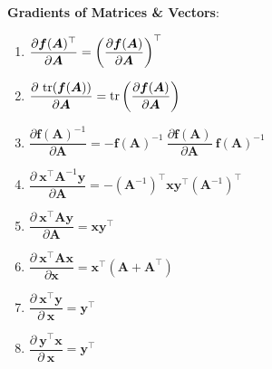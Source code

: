 \vspace{0.5cm}
\textbf{Gradients of Matrices \& Vectors}:

\begin{multicols}{2}
\begin{enumerate}[resume*=vcalrules]
    \item $
        \dfrac{\partial \bm{f}(\bm{A})^\top}{\partial \bm{A}}
        = \left(\dfrac{\partial \bm{f}(\bm{A})}{\partial \bm{A}}\right)^\top
    $
    \hfill \cite{mfml/book/mml/Deisenroth-Faisal-Ong}

    \item $
        \dfrac{\partial\ \tr(\bm{f}(\bm{A}))}{\partial \bm{A}}
        = \tr\dParenBrac{\dfrac{\partial \bm{f}(\bm{A})}{\partial \bm{A}}}
    $
    \hfill \cite{mfml/book/mml/Deisenroth-Faisal-Ong}

    \item 
    $
        \dfrac{\partial \bm{f}(\bm{A})^{-1}}{\partial \bm{A}}
        = -\bm{f}(\bm{A})^{-1}\ \dfrac{\partial \bm{f}(\bm{A})}{\partial \bm{A}} \ \bm{f}(\bm{A})^{-1}
    $ 
    \hfill \cite{mfml/book/mml/Deisenroth-Faisal-Ong}

    \item 
    $
        \dfrac{\partial\ \bm{x}^\top \bm{A}^{-1}\bm{y}}{\partial \bm{A}}
        = -(\bm{A}^{-1})^\top \bm{xy}^\top (\bm{A}^{-1})^\top
    $
    \hfill \cite{mfml/book/mml/Deisenroth-Faisal-Ong}

    \item 
    $
        \dfrac{\partial\ \bm{x}^\top \bm{A}\bm{y}}{\partial \bm{A}}
        = \bm{xy}^\top 
    $
    \hfill \cite{mfml/book/mml/Deisenroth-Faisal-Ong}

    \item 
    $
        \dfrac{\partial\ \bm{x}^\top \bm{A}\bm{x}}{\partial \bm{x}}
        = \bm{x}^\top(\bm{A} + \bm{A}^\top) 
    $
    \hfill \cite{mfml/book/mml/Deisenroth-Faisal-Ong}

    \item 
    $
        \dfrac{\partial\ \bm{x}^\top \bm{y}}{\partial\ \bm{x}} = \bm{y}^\top
    $
    \hfill \cite{mfml/book/mml/Deisenroth-Faisal-Ong}

    \item 
    $
        \dfrac{\partial\ \bm{y}^\top \bm{x}}{\partial\ \bm{x}} = \bm{y}^\top
    $
    \hfill \cite{mfml/book/mml/Deisenroth-Faisal-Ong}
\end{enumerate}
\end{multicols}

